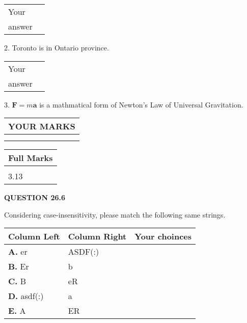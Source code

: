 \documentclass[12pt]{article}
\begin{document}
\noindent\begin{tabular}{|l|l|}\hline Your&\hspace{.2in} \\ answer&\hspace{.2in} \\ \hline \end{tabular}
2.  %
Toronto is in  %
Ontario province.
 
\noindent\begin{tabular}{|l|l|}\hline Your&\hspace{.2in} \\ answer&\hspace{.2in} \\ \hline \end{tabular}
3.  %
$\mathbf{F}=m\mathbf{a}$ is a mathmatical form of
Newton's Law of Universal Gravitation.
 

 
\vspace{0.3in}
  
\vspace{0.2in}
  
\noindent\begin{tabular}{|l|}
\hline
 YOUR MARKS  \\
\hline
 \\ 
 \\ 
\hline
\end{tabular}
\hspace{0.05in} \begin{tabular}{|l|}
\hline
 Full Marks  \\
\hline
 \\ 
3.13 \\
\hline
\end{tabular}
{\textbf{\Large{QUESTION
26.6 
}}}
  
  
Considering case-insensitivity, please match the following same strings.
  
  
\begin{tabular}{|l|l|l|}
 \hline
 Column Left & Column Right  & Your choinces \\ 
 \hline
{\textbf{\large{
A.}}}
er
  & 
ASDF(:)
 & 
 \\ 
 \hline
{\textbf{\large{
B.}}}
Er
  & 
b
 & 
 \\ 
 \hline
{\textbf{\large{
C.}}}
B
  & 
eR
 & 
 \\ 
 \hline
{\textbf{\large{
D.}}}
asdf(:)
  & 
a
 & 
 \\ 
 \hline
{\textbf{\large{
E.}}}
A
  & 
ER
 & 
 \\ 
 \hline
 \end{tabular}
  
\end{document}
